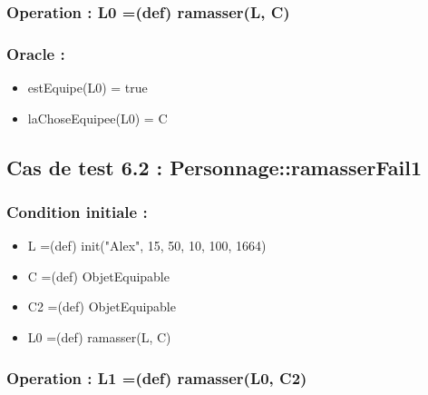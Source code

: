 \documentclass[11pt]{article}
\begin{document}
\subsubsection{Operation : L0 =(def) ramasser(L, C)}
\label{sec-1.15.2}

\subsubsection{Oracle :}
\label{sec-1.15.3}

\begin{itemize}

\item estEquipe(L0) = true\\
\label{sec-1.15.3.1}


\item laChoseEquipee(L0) = C\\
\label{sec-1.15.3.2}



\end{itemize} %
\subsection{Cas de test 6.2 : Personnage::ramasserFail1}
\label{sec-1.16}

\subsubsection{Condition initiale :}
\label{sec-1.16.1}

\begin{itemize}

\item L =(def) init("Alex", 15, 50, 10, 100, 1664)\\
\label{sec-1.16.1.1}


\item C =(def) ObjetEquipable\\
\label{sec-1.16.1.2}


\item C2 =(def) ObjetEquipable\\
\label{sec-1.16.1.3}


\item L0 =(def) ramasser(L, C)\\
\label{sec-1.16.1.4}

\end{itemize} %
\subsubsection{Operation : L1 =(def) ramasser(L0, C2)}
\label{sec-1.16.2}
\end{document}
